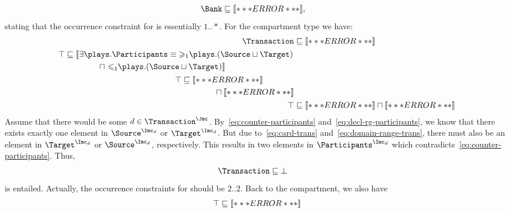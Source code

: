 \begin{example}
\begin{align}
  \Bank & \sqsubseteq \oax{(\atleast{1}{\counts}{\Customer})(\occurCounter)},\label{eq:counter-customer}
\end{align}
stating that the occurrence constraint for \Customer is essentially $1..*$. For the
\Transaction compartment type we have:
\begin{align}
  \Transaction & \sqsubseteq \oax{(\atleast{1}{\counts}{\Participants} \sqcap
                 \atmost{1}{\counts}{\Participants})(\occurCounter)}\label{eq:counter-participants}\\
  \begin{split}
    \top & \sqsubseteq\oaxl{\exists\plays.\Participants \equiv
      \atleast{1}{\plays}{(\Source\sqcup\Target)}}\\
    & \qquad\qquad \sqcap \oaxr{\atmost{1}{\plays}{(\Source\sqcup\Target)}}
  \end{split}\label{eq:decl-rg-participants}\\
  \begin{split}
    \top & \sqsubseteq \oax{\Source \sqsubseteq \atleast{1}{\transBank}{\top} \sqcap
      \atmost{1}{\transBank}{\top}}\\
    & \qquad\qquad \sqcap \oax{\Target \sqsubseteq \atleast{1}{\transBank^{-}}{\top} \sqcap
      \atmost{1}{\transBank^{-}}{\top}} 
  \end{split}\label{eq:card-trans}\\
   \top & \sqsubseteq \oax{\exists\transBank.\top\sqsubseteq\Source} \sqcap \oax{\exists\transBank^{-}.\top\sqsubseteq\Target}\label{eq:domain-range-trans}
\end{align}
Assume that there would be some $d\in\Transaction^{\J}$.  By~\eqref{eq:counter-participants}
and~\eqref{eq:decl-rg-participants}, we know that there exists exactly one element in
$\Source^{\I_{d}}$ or $\Target^{\I_{d}}$. But due to~\eqref{eq:card-trans}
and~\eqref{eq:domain-range-trans}, there must also be an element in $\Target^{\I_{d}}$ or
$\Source^{\I_{d}}$, respectively. This results in two elements in $\Participants^{\I_{d}}$ which
contradicts~\eqref{eq:counter-participants}. Thus,
\begin{align}
  \Transaction & \sqsubseteq \bot\label{eq:transaction-bottom}
\end{align}
is entailed. Actually, the occurrence constraints for \Participants should be $2..2$.  Back to the
\Bank compartment, we also have
\begin{align}
  \top & \sqsubseteq \oax{\Customer\sqsubseteq\atleast{1}{\issues}{\top}}\label{eq:card-issues}\\

\end{align}
\end{example}
